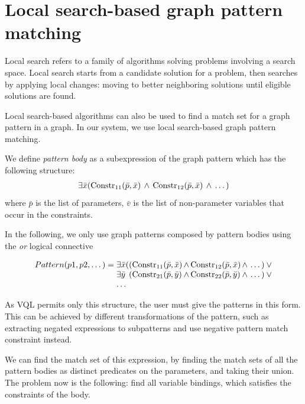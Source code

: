 \section{Local search-based graph pattern matching}

Local search refers to a family of algorithms solving problems involving a search space. 
Local search starts from a candidate solution for a problem, then searches by applying local changes: moving to better neighboring solutions until eligible solutions are found.

Local search-based algorithms can also be used to find a match set for a graph pattern in a graph.
In our system, we use local search-based graph pattern matching. 

We define \emph{pattern body} as a subexpression of the graph pattern which has the following structure:
\begin{equation*}
\begin{array}{@{}c@{}}
\exists{\bar{x}} 
(\text{Constr}_{11}(\bar{p},\bar{x} ) \, \wedge \, 
 \text{Constr}_{12}(\bar{p},\bar{x} ) \, \wedge \, \dots{})
\end{array}
\end{equation*}
where $\bar{p}$ is the list of parameters, $\bar{v}$ is the list of non-parameter variables that occur in the constraints.

In the following, we only use graph patterns composed by pattern bodies using the \emph{or} logical connective

\begin{equation*}
\begin{array}{@{}r@{}l@{}l@{}l@{}l@{}}
Pattern(p1, p2, \dots) = \;
& \exists{\bar{x}} ( & 
(\text{Constr}_{11}(\bar{p},\bar{x} ) & \, \wedge \, \text{Constr}_{12}(\bar{p},\bar{x} ) & \, \wedge \, \dots{}) \: \vee \\

& \exists{\bar{y}} & 
(\text{Constr}_{21}(\bar{p},\bar{y} ) & \, \wedge \, \text{Constr}_{22}(\bar{p},\bar{y} ) & \, \wedge \, \dots{}) \: \vee \\
& \dots{}
\end{array}
\end{equation*}

As VQL permits only this structure, the user must give the patterns in this form. This can be achieved by different transformations of the pattern, such as extracting negated expressions to subpatterns and use negative pattern match constraint instead.

We can find the match set of this expression, by finding the match sets of all the pattern bodies as distinct predicates on the parameters, and taking their union.
The problem now is the following: find all variable bindings, which satisfies the constraints of the body.

